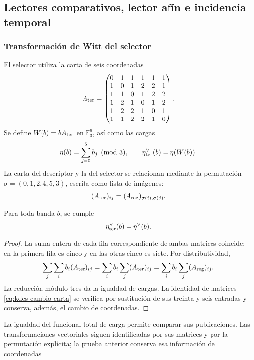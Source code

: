 \subsection{Lectores comparativos, lector afín e incidencia temporal}

\subsubsection{Transformación de Witt del selector}

El selector utiliza la carta de seis coordenadas
\[
 A_{\rm ter}=
 \begin{pmatrix}
 0&1&1&1&1&1\\
 1&0&1&2&2&1\\
 1&1&0&1&2&2\\
 1&2&1&0&1&2\\
 1&2&2&1&0&1\\
 1&1&2&2&1&0
 \end{pmatrix}.
\]
Se define $W(b)=bA_{\rm ter}$ en $\mathbb F_3^6$, así como las cargas
\[
 \eta(b)=\sum_{j=0}^5 b_j\pmod3,
 \qquad\eta_{\rm ter}^\vee(b)=\eta(W(b)).
\]
La carta del descriptor y la del selector se relacionan mediante la
permutación $\sigma=(0,1,2,4,5,3)$, escrita como lista de imágenes:
\begin{equation}
 (A_{\rm ter})_{ij}=(A_{\rm reg})_{\sigma(i),\sigma(j)}.
 \label{eq:kdes-cambio-carta}
\end{equation}

\begin{lemma}
Para toda banda $b$, se cumple
\[
 \eta_{\rm ter}^\vee(b)=\eta^\vee(b).
\]
\end{lemma}
\begin{proof}
La suma entera de cada fila correspondiente de ambas matrices coincide:
en la primera fila es cinco y en las otras cinco es siete. Por
distributividad,
\[
 \sum_j\sum_i b_i(A_{\rm ter})_{ij}
 =\sum_i b_i\sum_j(A_{\rm ter})_{ij}
 =\sum_i b_i\sum_j(A_{\rm reg})_{ij}.
\]
La reducción módulo tres da la igualdad de cargas. La identidad de
matrices \eqref{eq:kdes-cambio-carta} se verifica por sustitución de sus
treinta y seis entradas y conserva, además, el cambio de coordenadas.
\end{proof}

La igualdad del funcional total de carga permite comparar sus
publicaciones. Las transformaciones vectoriales siguen identificadas
por sus matrices y por la permutación explícita; la prueba anterior
conserva esa información de coordenadas.

